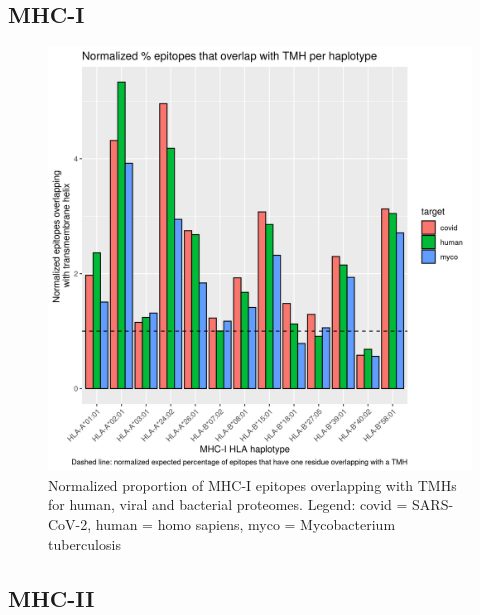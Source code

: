 



\subsection{MHC-I}

\begin{figure}[!htbp]
  \includegraphics[width=\textwidth]{bbbq_1_smart_results/fig_f_tmh_mhc1_2_normalized.png}
  \caption{
    Normalized proportion of MHC-I epitopes overlapping with TMHs
    for human, viral and bacterial proteomes.
    Legend: covid = SARS-CoV-2,
    human = homo sapiens, myco = Mycobacterium tuberculosis
  }
  \label{fig:f_tmh_mhc1_normalized}
\end{figure}



\subsection{MHC-II}

